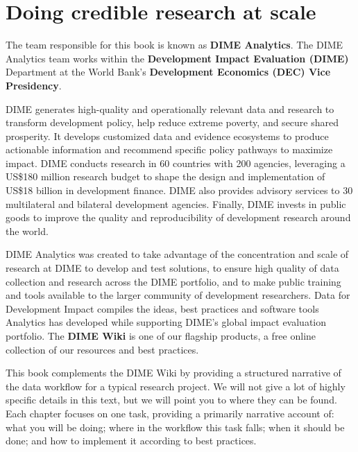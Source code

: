 
\section{Doing credible research at scale}

The team responsible for this book is known as \textbf{DIME Analytics}.
The DIME Analytics team works within the \textbf{Development Impact Evaluation (DIME)} Department
at the World Bank's \textbf{Development Economics (DEC) Vice Presidency}.

DIME generates high-quality and operationally relevant data and research 
to transform development policy, help reduce extreme poverty, and secure shared prosperity. 
It develops customized data and evidence ecosystems to produce actionable information 
and recommend specific policy pathways to maximize impact.
DIME conducts research in 60 countries with 200 agencies, leveraging a 
US\$180 million research budget to shape the design and implementation of 
US\$18 billion in development finance. 
DIME also provides advisory services to 30 multilateral and bilateral development agencies. 
Finally, DIME invests in public goods to improve the quality and reproducibility of development research around the world. 

DIME Analytics was created to take advantage of the concentration and scale of research at DIME to develop and test solutions, 
to ensure high quality of data collection and research across the DIME portfolio, 
and to make public training and tools available to the larger community of development researchers.
Data for Development Impact compiles the ideas, best practices and software tools Analytics 
has developed while supporting DIME's global impact evaluation portfolio. 
The \textbf{DIME Wiki} is one of our flagship products, a free online collection of our resources and best practices.

This book complements the DIME Wiki by providing a structured narrative of the data workflow for a typical research project. 
We will not give a lot of highly specific details in this text,
but we will point you to where they can be found.
Each chapter focuses on one task, providing a primarily narrative account of:
what you will be doing; where in the workflow this task falls;
when it should be done; and how to implement it according to best practices.



